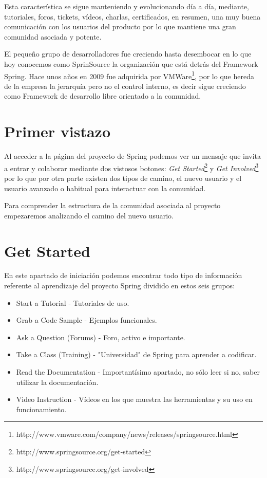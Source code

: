 \documentclass[11pt]{scrartcl}
\begin{document}
Esta caracter\'istica se sigue manteniendo y evolucionando d\'ia a d\'ia, mediante, tutoriales, foros, tickets, v\'ideos, charlas, certificados, en resumen, una muy buena comunicaci\'on con los usuarios del producto por lo que mantiene una gran comunidad asociada y potente.

El peque\~no grupo de desarrolladores fue creciendo hasta desembocar en lo que hoy conocemos como SprinSource la organizaci\'on que est\'a detr\'as del Framework Spring. Hace unos a\~nos en 2009 fue adquirida por VMWare\footnote{http://www.vmware.com/company/news/releases/springsource.html}, por lo que hereda de la empresa la jerarqu\'ia pero no el control interno, es decir sigue creciendo como Framework de desarrollo libre orientado a la comunidad.

\section{Primer vistazo}

Al acceder a la p\'agina del proyecto de Spring podemos ver un mensaje que invita a entrar y colaborar mediante dos vistosos botones: \emph{Get Started}\footnote{http://www.springsource.org/get-started} y \emph{Get Involved}\footnote{http://www.springsource.org/get-involved} por lo que por otra parte existen dos tipos de camino, el nuevo usuario y el usuario avanzado o habitual para interactuar con la comunidad.

Para comprender la estructura de la comunidad asociada al proyecto empezaremos analizando el camino del nuevo usuario.

\section{Get Started}

En este apartado de iniciaci\'on podemos encontrar todo tipo de informaci\'on referente al aprendizaje del proyecto Spring dividido en estos seis grupos:

\begin{itemize}
    \item Start a Tutorial - Tutoriales de uso.
    \item Grab a Code Sample - Ejemplos funcionales.
    \item Ask a Question (Forums) - Foro, activo e importante.
    \item Take a Class (Training) - "Universidad" de Spring para aprender a codificar.
    \item Read the Documentation - Important\'isimo apartado, no s\'olo leer si no, saber utilizar la documentaci\'on.
    \item Video Instruction - V\'ideos en los que muestra las herramientas y su uso en funcionamiento.
\end{itemize}
\end{document}
